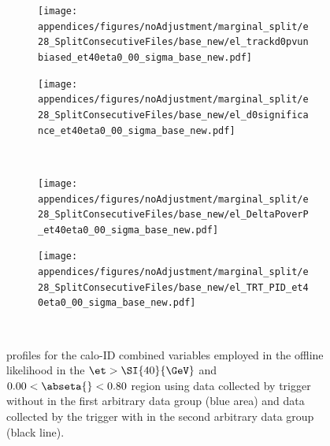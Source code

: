 \FloatBarrier

\begin{figure}[b]
\begin{center}
\begin{subfigure}[c]{.48\textwidth}
\centering
\texttt{[image: appendices/figures/noAdjustment/marginal\_split/e28\_SplitConsecutiveFiles/base\_new/el\_trackd0pvunbiased\_et40eta0\_00\_sigma\_base\_new.pdf]}
\caption{}%
\label{fig:groups_homogeneity_d0}
\end{subfigure}
\hfill
\begin{subfigure}[c]{.48\textwidth}
\centering
\texttt{[image: appendices/figures/noAdjustment/marginal\_split/e28\_SplitConsecutiveFiles/base\_new/el\_d0significance\_et40eta0\_00\_sigma\_base\_new.pdf]}
\caption{}%
\label{fig:groups_homogeneity_d0sig}
\end{subfigure} \\
\begin{subfigure}[c]{.48\textwidth}
\centering
\texttt{[image: appendices/figures/noAdjustment/marginal\_split/e28\_SplitConsecutiveFiles/base\_new/el\_DeltaPoverP\_et40eta0\_00\_sigma\_base\_new.pdf]}
\caption{}%
\label{fig:groups_homogeneity_poverp}
\end{subfigure}
\hfill
\begin{subfigure}[c]{.48\textwidth}
\centering
\texttt{[image: appendices/figures/noAdjustment/marginal\_split/e28\_SplitConsecutiveFiles/base\_new/el\_TRT\_PID\_et40eta0\_00\_sigma\_base\_new.pdf]}
\caption{}%
\label{fig:groups_homogeneity_trt_pid}
\end{subfigure} \\
\end{center}
\caption{%
profiles for the calo-ID combined variables employed in
the offline likelihood in the $\et>\SI{40}{\GeV}$ and $0.00<\abseta{}<0.80$
region using data collected by trigger without \rnn{} in the first arbitrary
data group (blue area) and data collected by the trigger with \rnn{} in the
second arbitrary data group (black line).
}%
\label{fig:groups_homogeneity_id}
\end{figure}%

